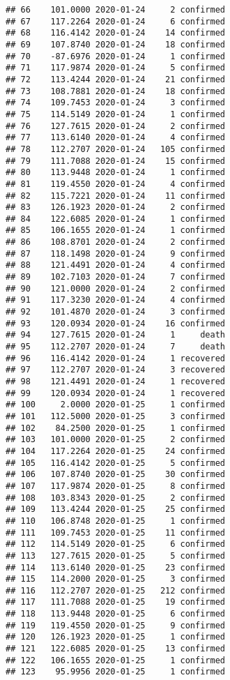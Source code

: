 \documentclass[
]{article}
\begin{document}
\begin{verbatim}
## 66    101.0000 2020-01-24     2 confirmed
## 67    117.2264 2020-01-24     6 confirmed
## 68    116.4142 2020-01-24    14 confirmed
## 69    107.8740 2020-01-24    18 confirmed
## 70    -87.6976 2020-01-24     1 confirmed
## 71    117.9874 2020-01-24     5 confirmed
## 72    113.4244 2020-01-24    21 confirmed
## 73    108.7881 2020-01-24    18 confirmed
## 74    109.7453 2020-01-24     3 confirmed
## 75    114.5149 2020-01-24     1 confirmed
## 76    127.7615 2020-01-24     2 confirmed
## 77    113.6140 2020-01-24     4 confirmed
## 78    112.2707 2020-01-24   105 confirmed
## 79    111.7088 2020-01-24    15 confirmed
## 80    113.9448 2020-01-24     1 confirmed
## 81    119.4550 2020-01-24     4 confirmed
## 82    115.7221 2020-01-24    11 confirmed
## 83    126.1923 2020-01-24     2 confirmed
## 84    122.6085 2020-01-24     1 confirmed
## 85    106.1655 2020-01-24     1 confirmed
## 86    108.8701 2020-01-24     2 confirmed
## 87    118.1498 2020-01-24     9 confirmed
## 88    121.4491 2020-01-24     4 confirmed
## 89    102.7103 2020-01-24     7 confirmed
## 90    121.0000 2020-01-24     2 confirmed
## 91    117.3230 2020-01-24     4 confirmed
## 92    101.4870 2020-01-24     3 confirmed
## 93    120.0934 2020-01-24    16 confirmed
## 94    127.7615 2020-01-24     1     death
## 95    112.2707 2020-01-24     7     death
## 96    116.4142 2020-01-24     1 recovered
## 97    112.2707 2020-01-24     3 recovered
## 98    121.4491 2020-01-24     1 recovered
## 99    120.0934 2020-01-24     1 recovered
## 100     2.0000 2020-01-25     1 confirmed
## 101   112.5000 2020-01-25     3 confirmed
## 102    84.2500 2020-01-25     1 confirmed
## 103   101.0000 2020-01-25     2 confirmed
## 104   117.2264 2020-01-25    24 confirmed
## 105   116.4142 2020-01-25     5 confirmed
## 106   107.8740 2020-01-25    30 confirmed
## 107   117.9874 2020-01-25     8 confirmed
## 108   103.8343 2020-01-25     2 confirmed
## 109   113.4244 2020-01-25    25 confirmed
## 110   106.8748 2020-01-25     1 confirmed
## 111   109.7453 2020-01-25    11 confirmed
## 112   114.5149 2020-01-25     6 confirmed
## 113   127.7615 2020-01-25     5 confirmed
## 114   113.6140 2020-01-25    23 confirmed
## 115   114.2000 2020-01-25     3 confirmed
## 116   112.2707 2020-01-25   212 confirmed
## 117   111.7088 2020-01-25    19 confirmed
## 118   113.9448 2020-01-25     6 confirmed
## 119   119.4550 2020-01-25     9 confirmed
## 120   126.1923 2020-01-25     1 confirmed
## 121   122.6085 2020-01-25    13 confirmed
## 122   106.1655 2020-01-25     1 confirmed
## 123    95.9956 2020-01-25     1 confirmed

\end{verbatim}
\end{document}
